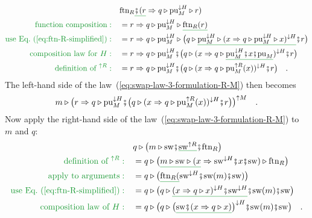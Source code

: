 \begin{align*}
 & \text{ftn}_{R}\gunderline{\bef(r}\Rightarrow q\triangleright\text{pu}_{M}^{\downarrow H}\triangleright r)\\
{\color{greenunder}\text{function composition}:}\quad & =r\Rightarrow q\triangleright\text{pu}_{M}^{\downarrow H}\triangleright\gunderline{\text{ftn}_{R}(r)}\\
{\color{greenunder}\text{use Eq.~(\ref{eq:ftn-R-simplified})}:}\quad & =r\Rightarrow q\triangleright\text{pu}_{M}^{\downarrow H}\triangleright\big(q\triangleright\gunderline{\text{pu}_{M}^{\downarrow H}\triangleright(x\Rightarrow q\triangleright\text{pu}_{M}^{\downarrow H}\triangleright x)^{\downarrow H}}\bef r\big)\\
{\color{greenunder}\text{composition law for }H:}\quad & =r\Rightarrow q\triangleright\text{pu}_{M}^{\downarrow H}\bef\big(q\triangleright(x\Rightarrow q\triangleright\gunderline{\text{pu}_{M}^{\downarrow H}\bef x\bef\text{pu}_{M}})^{\downarrow H}\bef r\big)\\
{\color{greenunder}\text{definition of }^{\uparrow R}:}\quad & =r\Rightarrow q\triangleright\text{pu}_{M}^{\downarrow H}\bef\big(q\triangleright(x\Rightarrow q\triangleright\text{pu}_{M}^{\uparrow R}(x))^{\downarrow H}\bef r\big)\quad.
\end{align*}
The left-hand side of the law~(\ref{eq:swap-law-3-formulation-R-M})
then becomes
\[
m\triangleright\big(r\Rightarrow q\triangleright\text{pu}_{M}^{\downarrow H}\bef\big(q\triangleright(x\Rightarrow q\triangleright\text{pu}_{M}^{\uparrow R}(x))^{\downarrow H}\bef r\big)\big)^{\uparrow M}\quad.
\]
Now apply the right-hand side of the law~(\ref{eq:swap-law-3-formulation-R-M})
to $m$ and $q$:
\begin{align}
 & q\triangleright\big(m\triangleright\text{sw}\bef\gunderline{\text{sw}^{\uparrow R}}\bef\text{ftn}_{R}\big)\nonumber \\
{\color{greenunder}\text{definition of }^{\uparrow R}:}\quad & =q\triangleright\big(\gunderline{m\triangleright\text{sw}\triangleright(x}\Rightarrow\text{sw}^{\downarrow H}\bef x\bef\text{sw})\triangleright\text{ftn}_{R}\big)\nonumber \\
{\color{greenunder}\text{apply to arguments}:}\quad & =q\triangleright\big(\gunderline{\text{ftn}_{R}(}\text{sw}^{\downarrow H}\bef\text{sw}(m)\bef\text{sw})\big)\nonumber \\
{\color{greenunder}\text{use Eq.~(\ref{eq:ftn-R-simplified})}:}\quad & =q\triangleright\big(q\triangleright\gunderline{(x\Rightarrow q\triangleright x)^{\downarrow H}\bef\text{sw}^{\downarrow H}}\bef\text{sw}(m)\bef\text{sw}\big)\nonumber \\
{\color{greenunder}\text{composition law of }H:}\quad & =q\triangleright\big(q\triangleright\big(\gunderline{\text{sw}\bef(x\Rightarrow q\triangleright x)}\big)^{\downarrow H}\bef\text{sw}(m)\bef\text{sw}\big)\quad.\label{eq:swap-laws-derivation2}
\end{align}
